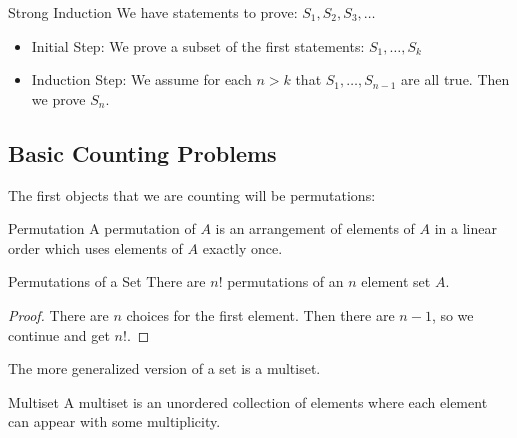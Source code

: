 \documentclass{report}
\begin{document}
\begin{definition}{Strong Induction}
    We have statements to prove: $S_{1}, S_{2}, S_{3}, \ldots$
        \begin{itemize}
            \item Initial Step: We prove a subset of the first statements: $S_{1}, \ldots, S_{k}$

            \item Induction Step: We assume for each $n > k$ that $S_{1}, \ldots, S_{n - 1}$ are all true. Then we prove $S_{n}$.
        \end{itemize}
\end{definition}

\begin{topic}
    \section{Basic Counting Problems}
\end{topic}

The first objects that we are counting will be permutations:
\begin{definition}{Permutation}
    A permutation of $A$ is an arrangement of elements of $A$ in a linear order which uses elements of $A$ exactly once.
\end{definition}

\begin{theorem}{Permutations of a Set}
    There are $n!$ permutations of an $n$ element set $A$.
\end{theorem}
    \begin{proof}
        There are $n$ choices for the first element. Then there are $n - 1$, so we continue and get $n!$.
    \end{proof}

The more generalized version of a set is a multiset.

\begin{definition}{Multiset}
    A multiset is an unordered collection of elements where each element can appear with some multiplicity.
\end{definition}
\end{document}
